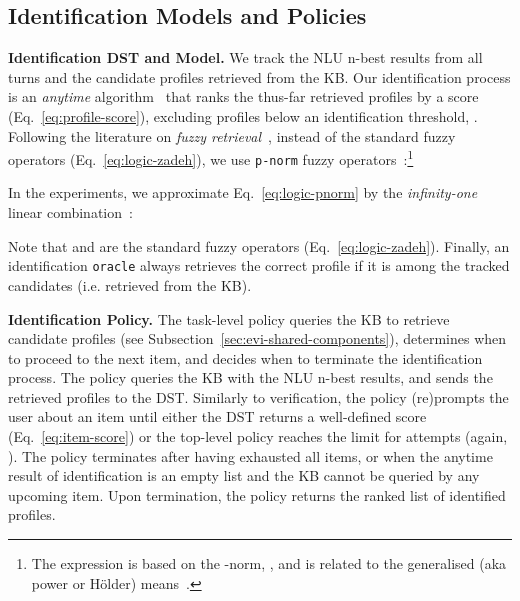 \documentclass[11pt]{article}
\newcommand{\sparagraph}[1]{\noindent\textbf{#1.}}
\newcommand{\rparagraph}[1]{\vspace{1.4mm}\noindent\textbf{#1.}}
\begin{document}
{\subsection{Identification Models and Policies}
\label{sec:identification-policy}



\sparagraph{Identification DST and Model}
We track the NLU n-best results from all turns
and the candidate profiles retrieved from the KB.
Our identification process
is an \textit{anytime} algorithm~\cite{zilberstein1996using}
that ranks the thus-far retrieved profiles
by a score (Eq.~\ref{eq:profile-score}),
excluding profiles below an identification threshold, .
Following the literature on \textit{fuzzy retrieval}~\cite{zadrozny2009fuzzy},
instead of the standard fuzzy operators (Eq.~\ref{eq:logic-zadeh}),
we use \texttt{p-norm} fuzzy operators~\cite{salton1983extended}:\footnote{
The expression is based on the -norm,
,
and is related to the generalised (aka power or Hölder) means~\cite{bullen2013handbook}.}

\vspace{-3mm}
{\small

}In the experiments,
we approximate Eq.~\ref{eq:logic-pnorm} by the \textit{infinity-one} linear combination~\cite{smith1990aspects}:

\vspace{-1.5mm}
{\small

}Note that  and  are the standard fuzzy operators (Eq.~\ref{eq:logic-zadeh}).
Finally, an identification \texttt{oracle}
always retrieves the correct profile if it is among the tracked candidates (i.e. retrieved from the KB).

\rparagraph{Identification Policy}
The task-level policy
queries the KB to retrieve candidate profiles
(see Subsection~\ref{sec:evi-shared-components}),
determines when to proceed to the next item,
and decides when to terminate the identification process.
The policy queries the KB with the NLU n-best results,
and sends the retrieved profiles to the DST.
Similarly to verification,
the policy
(re)prompts the user about an item
until
either the DST returns a well-defined score (Eq.~\ref{eq:item-score})
or the top-level policy reaches the limit for attempts
(again, ).
The policy terminates
after having exhausted all items,
or when the anytime result of identification is an empty list
and the KB cannot be queried by any upcoming item.
Upon termination, 
the policy returns the ranked list of identified profiles.







}
\end{document}
